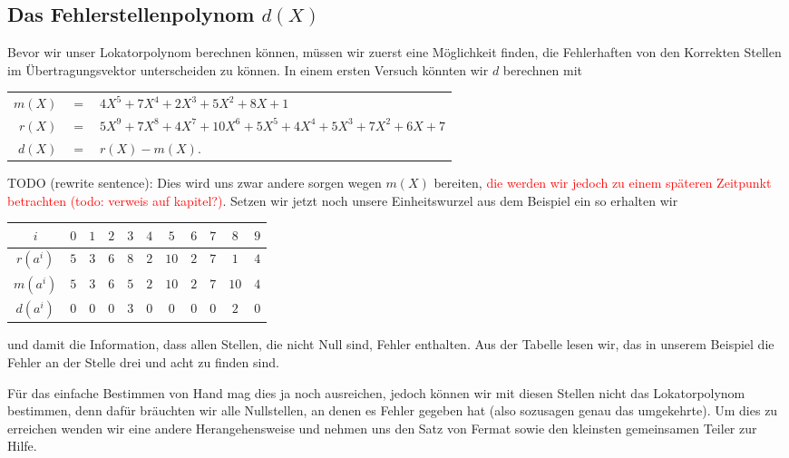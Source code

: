 \subsection{Das Fehlerstellenpolynom $d(X)$
	\label{reedsolomon:subsection:fehlerpolynom}}
Bevor wir unser Lokatorpolynom berechnen können, müssen wir zuerst eine Möglichkeit finden, die Fehlerhaften von den Korrekten Stellen im Übertragungsvektor unterscheiden zu können. In einem ersten Versuch könnten wir $d$ berechnen mit
\begin{center}
\begin{tabular}{r c l}
	$m(X)$ & $=$ & $4X^5 + 7X^4 + 2X^3 + 5X^2 + 8X + 1$ \\
	$r(X)$ & $=$ & $5X^9 + 7X^8 + 4X^7 + 10X^6 + 5X^5 + 4X^4 + 5X^3 + 7X^2 + 6X + 7$ \\
	$d(X)$ & $=$ & $r(X) - m(X)$.
\end{tabular}
\end{center}
TODO (rewrite sentence): Dies wird uns zwar andere sorgen wegen $m(X)$ bereiten, \textcolor{red}{die werden wir jedoch zu einem späteren Zeitpunkt betrachten (todo: verweis auf kapitel?)}.
Setzen wir jetzt noch unsere Einheitswurzel aus dem Beispiel ein so erhalten wir
\begin{center}
\begin{tabular}{c c c c c c c c c c c}
	\hline
	$i$& $0$& $1$& $2$& $3$& $4$& $5$& $6$& $7$& $8$& $9$\\
	\hline
	$r(a^{i})$& $5$& $3$& $6$& $8$& $2$& $10$& $2$& $7$& $1$& $4$\\
	$m(a^{i})$& $5$& $3$& $6$& $5$& $2$& $10$& $2$& $7$& $10$& $4$\\
	$d(a^{i})$& $0$& $0$& $0$& $3$& $0$& $0$& $0$& $0$& $2$& $0$\\
	\hline
\end{tabular}
\end{center}
und damit die Information, dass allen Stellen, die nicht Null sind, Fehler enthalten. 
Aus der Tabelle lesen wir, das in unserem Beispiel die Fehler an der Stelle drei und acht zu finden sind.

Für das einfache Bestimmen von Hand mag dies ja noch ausreichen, jedoch können wir mit diesen Stellen nicht das Lokatorpolynom bestimmen, denn dafür bräuchten wir alle Nullstellen, an denen es Fehler gegeben hat (also sozusagen genau das umgekehrte). Um dies zu erreichen wenden wir eine andere Herangehensweise und nehmen uns den Satz von Fermat sowie den kleinsten gemeinsamen Teiler zur Hilfe.

